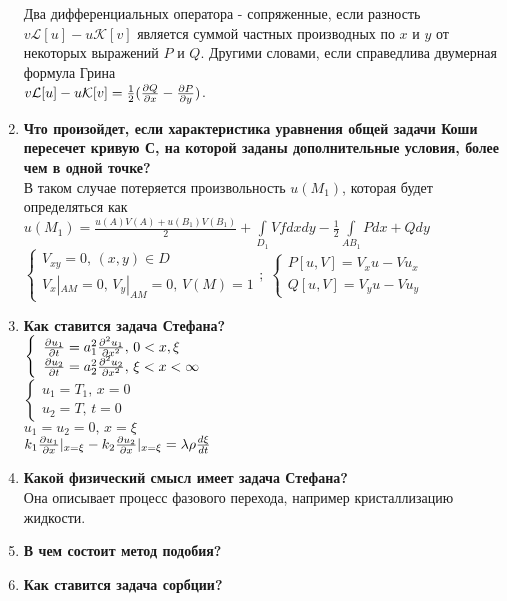 \begin{enumerate}[label=\textbf{\underline{\arabic*.}}]
      Два дифференциальных оператора - сопряженные, если разность $v\mathcal{L}[u]-u\mathcal{K}[v]$ является суммой частных производных по $x$ и $y$ от некоторых выражений $P$ и $Q$. Другими словами, если справедлива двумерная формула Грина\\
      $v\mathcal{L}[u]-u\mathcal{K}[v]=\frac1{2}(\frac{\partial Q}{\partial x}-\frac{\partial P}{\partial y}) $.
\item \textbf{Что произойдет, если характеристика уравнения общей задачи Коши пересечет кривую С, на которой заданы дополнительные условия, более чем в одной точке?}\\
      В таком случае потеряется произвольность $u(M_1)$, которая будет определяться как\\
      $ u(M_1)=\frac{u(A)V(A)+u(B_1)V(B_1)}{2}+\int\limits_{D_1}Vfdxdy-\frac{1}{2}\int\limits_{AB_1}Pdx+Qdy$\\
      $\left\{\begin{array}{l}
            V_{xy}=0,\,(x,y)\in D\\
            V_x|_{AM}=0,\,V_y|_{AM}=0,\,V(M)=1
      \end{array}\right.;\;
      \left\{\begin{array}{l}
            P[u,V]=V_x u-Vu_x\\
            Q[u,V]=V_y u-Vu_y
      \end{array}\right.$
\item \textbf{Как ставится задача Стефана?}\\
      $\left\{\begin{array}{l}
            \frac{\partial u_1}{\partial t}=a_1^2\frac{\partial^2 u_1}{\partial x^2},\,0<x,\xi\\
            \frac{\partial u_2}{\partial t}=a_2^2\frac{\partial^2 u_2}{\partial x^2},\,\xi<x<\infty
      \end{array}\right.$\\
      $\left\{\begin{array}{l}
            u_1 = T_1,\,x=0\\
            u_2 = T,\,t=0
      \end{array}\right.$\\
      $u_1=u_2=0,\,x=\xi$\\
      $ k_1\frac{\partial u_1}{\partial x}|_{x=\xi}-k_2\frac{\partial u_2}{\partial x}|_{x=\xi}=\lambda\rho\frac{d \xi}{d t}$
\item \textbf{Какой физический смысл имеет задача Стефана?}\\
      Она описывает процесс фазового перехода, например кристаллизацию жидкости.
\item \textbf{В чем состоит метод подобия?}
\item \textbf{Как ставится задача сорбции?}\\

\end{enumerate}
